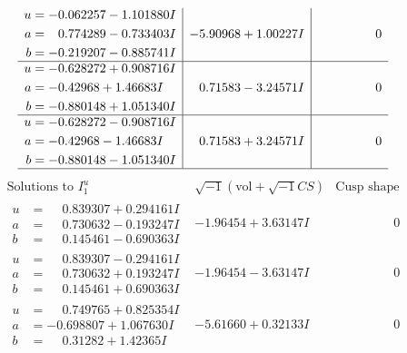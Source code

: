 \documentclass[1p]{elsarticle_modified}
\theoremstyle{definition}
\newcommand{\I}{\sqrt{-1}}
\begin{document}
$$\begin{array}{c|c|c}
\begin{aligned}
u &= -0.062257 - 1.101880 I \\
a &= \phantom{-}0.774289 - 0.733403 I \\
b &= -0.219207 - 0.885741 I\end{aligned}
 & -5.90968 + 1.00227 I & \phantom{-0.000000 } 0 \\ \hline\begin{aligned}
u &= -0.628272 + 0.908716 I \\
a &= -0.42968 + 1.46683 I \\
b &= -0.880148 + 1.051340 I\end{aligned}
 & \phantom{-}0.71583 - 3.24571 I & \phantom{-0.000000 } 0 \\ \hline\begin{aligned}
u &= -0.628272 - 0.908716 I \\
a &= -0.42968 - 1.46683 I \\
b &= -0.880148 - 1.051340 I\end{aligned}
 & \phantom{-}0.71583 + 3.24571 I & \phantom{-0.000000 } 0\\
 \hline 
 \end{array}$$\newpage$$\begin{array}{c|c|c}  
\text{Solutions to }I^u_{1}& \I (\text{vol} + \sqrt{-1}CS) & \text{Cusp shape}\\
 \hline 
\begin{aligned}
u &= \phantom{-}0.839307 + 0.294161 I \\
a &= \phantom{-}0.730632 - 0.193247 I \\
b &= \phantom{-}0.145461 - 0.690363 I\end{aligned}
 & -1.96454 + 3.63147 I & \phantom{-0.000000 } 0 \\ \hline\begin{aligned}
u &= \phantom{-}0.839307 - 0.294161 I \\
a &= \phantom{-}0.730632 + 0.193247 I \\
b &= \phantom{-}0.145461 + 0.690363 I\end{aligned}
 & -1.96454 - 3.63147 I & \phantom{-0.000000 } 0 \\ \hline\begin{aligned}
u &= \phantom{-}0.749765 + 0.825354 I \\
a &= -0.698807 + 1.067630 I \\
b &= \phantom{-}0.31282 + 1.42365 I\end{aligned}
 & -5.61660 + 0.32133 I & \phantom{-0.000000 } 0 \\ \hline\begin{aligned}

\end{aligned}
\end{array}$$
\end{document}

